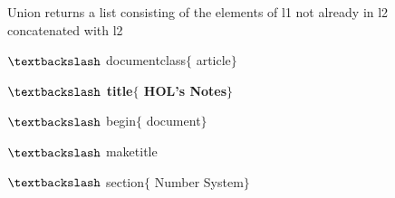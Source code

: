 \documentclass[12pt]{article}
\renewcommand{\_}{\kern-1.5pt\textunderscore\kern-1.5pt}
\begin{document}

\par


\vspace{\baselineskip}
{\fontsize{14pt}{16.8pt}\selectfont Union returns a list consisting of the elements of l1 not already in l2 concatenated with l2\par}\par


\vspace{\baselineskip}

\vspace{\baselineskip}

\vspace{\baselineskip}

\vspace{\baselineskip}
\begin{FlushLeft}
{\fontsize{14pt}{16.8pt}\selectfont $\textbackslash$ documentclass$ \{ $ article$ \} $ \par}
\end{FlushLeft}\par


\vspace{\baselineskip}
\begin{FlushLeft}
{\fontsize{14pt}{16.8pt}\selectfont \textbf{$\textbackslash$ title$ \{ $ HOL's Notes$ \} $ }\par}
\end{FlushLeft}\par


\vspace{\baselineskip}
\begin{FlushLeft}
{\fontsize{14pt}{16.8pt}\selectfont $\textbackslash$ begin$ \{ $ document$ \} $ \par}
\end{FlushLeft}\par

\begin{FlushLeft}
{\fontsize{14pt}{16.8pt}\selectfont $\textbackslash$ maketitle\par}
\end{FlushLeft}\par


\vspace{\baselineskip}
\begin{FlushLeft}
{\fontsize{14pt}{16.8pt}\selectfont $\textbackslash$ section$ \{ $ Number System$ \} $ \par}
\end{FlushLeft}\par
\end{document}

